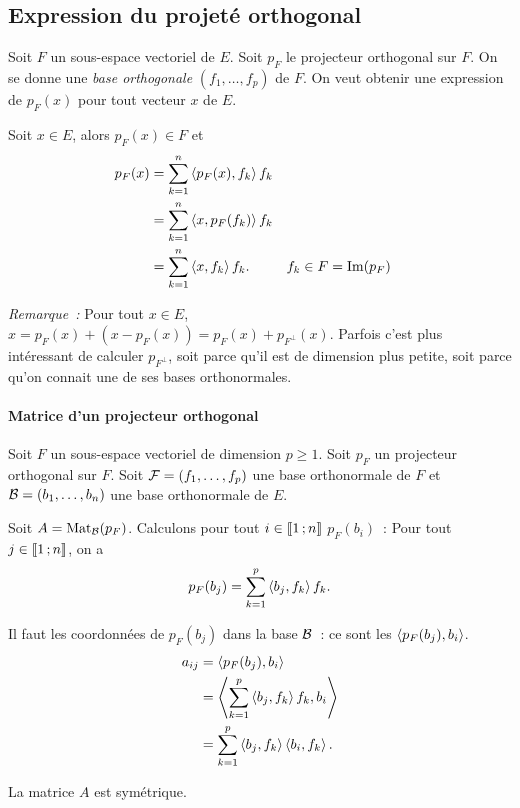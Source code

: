 \subsection{Expression du projeté orthogonal}

Soit \(F\) un sous-espace vectoriel de \(E\). Soit \(p_F\) le projecteur orthogonal sur \(F\). On se donne une \emph{base orthogonale} \((f_1, \ldots, f_p)\) de \(F\). On veut obtenir une expression de \(p_F(x)\) pour tout vecteur \(x\) de \(E\).

Soit \(x \in E\), alors \(p_F(x) \in F\) et
\begin{align}
  p_F(x) &=\sum_{k=1}^n \left\langle{p_F(x)},{f_k}\right\rangle f_k \\
  &=\sum_{k=1}^n \left\langle{x},{p_F(f_k)}\right\rangle f_k \\
  &=\sum_{k=1}^n \left\langle{x},{f_k}\right\rangle f_k. && f_k \in F=\operatorname{Im}(p_F)
\end{align}

\emph{Remarque~:} Pour tout \(x \in E\), \(x = p_F(x) +(x-p_F(x)) = p_F(x) + p_{F^\perp}(x)\). Parfois c'est plus intéressant de calculer \(p_{F^\perp}\), soit parce qu'il est de dimension plus petite, soit parce qu'on connait une de ses bases orthonormales.

\paragraph{Matrice d'un projecteur orthogonal}
Soit \(F\) un sous-espace vectoriel de dimension \(p \geqslant 1\). Soit \(p_F\) un projecteur orthogonal sur \(F\). Soit \(\mathcal{F}=(f_1, \ldots, f_p)\) une base orthonormale de \(F\) et \(\mathcal{B}=(b_1, \ldots, b_n)\) une base orthonormale de \(E\).

Soit \(A=\mathrm{Mat}_{\mathcal{B}}(p_F)\). Calculons pour tout \(i \in \mathopen{\llbracket}1\mathclose{}\mathpunct{};n\mathclose{\rrbracket}\) \(p_F(b_i)\)~: Pour tout \(j \in \mathopen{\llbracket}1\mathclose{}\mathpunct{};n\mathclose{\rrbracket}\), on a
\begin{equation}
  p_F(b_j)=\sum_{k=1}^p \left\langle{b_j},{f_k}\right\rangle f_k.
\end{equation}

Il faut les coordonnées de \(p_F(b_j)\) dans la base \(\mathcal{B}\)~: ce sont les \(\left\langle{p_F(b_j)},{b_i}\right\rangle\).
\begin{align}
  a_{ij} &= \left\langle{p_F(b_j)},{b_i}\right\rangle \\
  &= \left\langle{\sum_{k=1}^p \left\langle{b_j},{f_k}\right\rangle f_k},{b_i}\right\rangle \\
  &= \sum_{k=1}^p \left\langle{b_j},{f_k}\right\rangle \left\langle{b_i},{f_k}\right\rangle.
\end{align}

La matrice \(A\) est symétrique.

